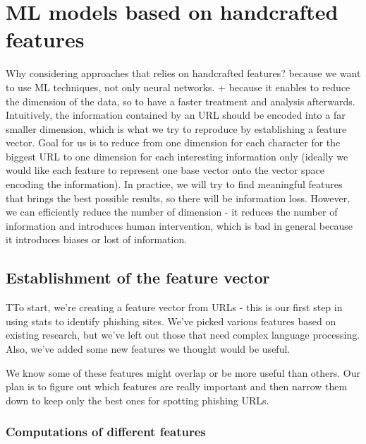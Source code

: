 \documentclass{article}
\begin{document}
    \section{ML models based on handcrafted features}\label{sec:models-based-on-handcrafted-features}

    Why considering approaches that relies on handcrafted features?
    because we want to use ML techniques, not only neural networks.
    + because it enables to reduce the dimension of the data, so to have a faster treatment and analysis afterwards.
    Intuitively, the information contained by an URL should be encoded into a far smaller dimension, which is what we try to reproduce by establishing a feature vector.
    Goal for us is to reduce from one dimension for each character for the biggest URL to one dimension for each interesting information only (ideally we would like each feature to represent one base vector onto the vector space encoding the information).
    In practice, we will try to find meaningful features that brings the best possible results, so there will be information loss.
    However, we can efficiently reduce the number of dimension
    - it reduces the number of information and introduces human intervention, which is bad in general because it introduces biases or lost of information.

    \subsection{Establishment of the feature vector}\label{subsec:establishement-of-the-feature-vector}

    TTo start, we're creating a feature vector from URLs - this is our first step in using stats to identify phishing sites.
    We've picked various features based on existing research, but we've left out those that need complex language processing.
    Also, we've added some new features we thought would be useful.

    We know some of these features might overlap or be more useful than others.
    Our plan is to figure out which features are really important and then narrow them down to keep only the best ones for spotting phishing URLs.

    \subsubsection{Computations of different features}
\end{document}
